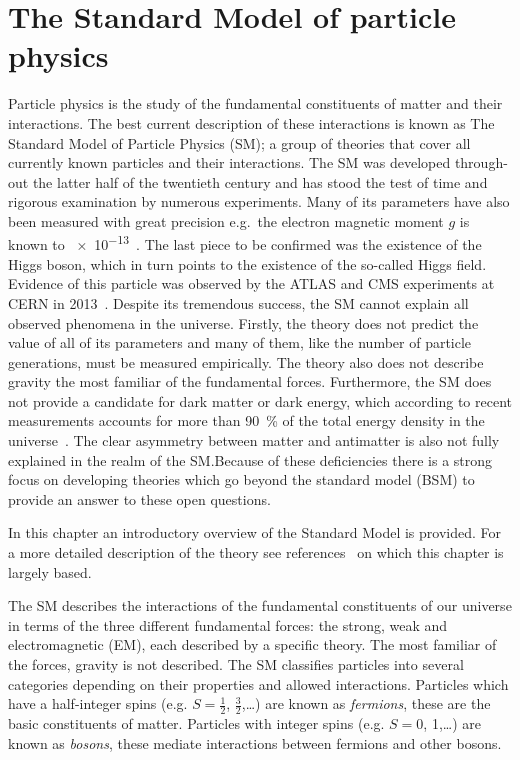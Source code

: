 \newcommand\scalemath[2]{\scalebox{#1}{\mbox{\ensuremath{\displaystyle #2}}}}
\chapter{The Standard Model of particle physics}\label{ch:Theory}

Particle physics is the study of the fundamental constituents of matter and their interactions. The best current description of these interactions is known as The Standard Model of Particle Physics (SM); a group of theories that cover all currently known particles and their interactions. The SM was developed through-out the latter half of the twentieth century and has stood the test of time and rigorous examination by numerous experiments. Many of its parameters have also been measured with great precision e.g.\ the electron magnetic moment $g$ is known to \num{e-13}~\cite{Theory:AwesomeSM}. The last piece to be confirmed was the existence of the Higgs boson, which in turn points to the existence of the so-called Higgs field. Evidence of this particle was observed by the ATLAS and CMS experiments at CERN in 2013~\cite{Theory:HiggsDiscoveryATLAS,Theory:HiggsDiscoveryCMS}.
Despite its tremendous success, the SM cannot explain all observed phenomena in the universe. Firstly, the theory does not predict the value of all of its parameters and many of them, like the number of particle generations, must be measured empirically. The theory also does not describe gravity the most familiar of the fundamental forces. Furthermore, the SM does not provide a candidate for dark matter or dark energy, which according to recent measurements accounts for more than \SI{90}{\percent} of the total energy density in the universe~\cite{Theory:DarkMatter}. The clear asymmetry between matter and antimatter is also not fully explained in the realm of the SM.\@ Because of these deficiencies there is a strong focus on developing theories which go beyond the standard model (BSM) to provide an answer to these open questions.

In this chapter an introductory overview of the Standard Model is provided. For a more detailed description of the theory see references~\cite{Theory:Perkins,Theory:IntroGriffiths} on which this chapter is largely based.

The SM describes the interactions of the fundamental constituents of our universe in terms of the three different fundamental forces: the strong, weak and electromagnetic (EM), each described by a specific theory. The most familiar of the forces, gravity is not described. The SM classifies particles into several categories depending on their properties and allowed interactions. Particles which have a half-integer spins (e.g. $S=\frac{1}{2}$, $\frac{3}{2}$,\ldots) are known as \emph{fermions}, these are the basic constituents of matter. Particles with integer spins (e.g. $S=0$, 1,\ldots) are known as \emph{bosons}, these mediate interactions between fermions and other bosons.

